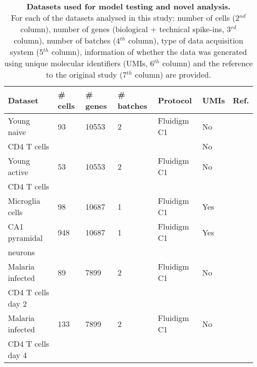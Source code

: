 \begin{table}[hb	]
\centering
\caption[Datasets used for model testing and novel analysis]{\textbf{Datasets used for model testing and novel analysis.} \\
For each of the datasets analysed in this study: number of cells (2$^{nd}$ column), number of genes (biological + technical spike-ins, 3$^{rd}$ column), number of batches (4$^{th}$ column), type of data acquisition system (5$^{th}$ column), information of whether the data was generated using unique molecular identifiers (UMIs, 6$^{th}$ column) and the reference to the original study (7$^{th}$ column) are provided.}
\label{tab2:datasets}
\begin{tabular}{lllllll}
\toprule
\textbf{Dataset} & \textbf{\# cells} & \textbf{\# genes} & \textbf{\# batches} & \textbf{Protocol} & \textbf{UMIs} & \textbf{Ref.}                       \\
\midrule
Young naive  & 93       & 10553    & 2          & Fluidigm C1       & No   & \citep{Martinez-jimenez2017} \\
CD4\plus{} T cells   &        &   &          &       & No   &  \\
\midrule

Young active    & 53       & 10553    & 2          & Fluidigm C1       & No   & \citep{Martinez-jimenez2017} \\
CD4\plus{} T cells    &        &     &           &        &    &  \\
\midrule

Microglia cells                         & 98       & 10687    & 1          & Fluidigm C1       & Yes  & \citep{Zeisel2015}           \\
\midrule

CA1 pyramidal                    & 948      & 10687    & 1          & Fluidigm C1       & Yes  & \citep{Zeisel2015}           \\
neurons       &       &     &           &       &   &           \\
\midrule

Malaria infected     & 89       & 7899     & 2          & Fluidigm C1       & No   & \citep{Lonnberg2017}         \\
CD4\plus{} T cells day 2     &        &      &          &  &    &  \\
\midrule

Malaria infected  & 133      & 7899     & 2          & Fluidigm C1       & No   & \citep{Lonnberg2017}         \\
CD4\plus{} T cells day 4     &       &      &    &  &    &\\
\midrule


\end{tabular}
\end{table}
